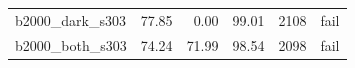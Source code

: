 \begin{table}[htbp]
\begin{tabular}{lrrrrr}
b2000\_\allowbreak{}dark\_\allowbreak{}s303 & %
77.85 & %
0.00 & %
99.01 & %
2108 & %
fail \\ %

b2000\_\allowbreak{}both\_\allowbreak{}s303 & %
74.24 & %
71.99 & %
98.54 & %
2098 & %
fail \\ %


\end{tabular}
\end{table}
